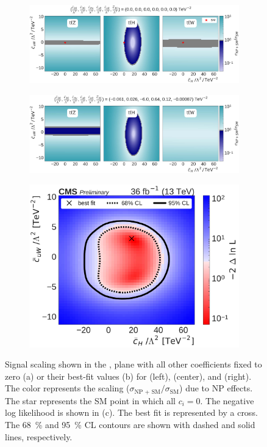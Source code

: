 \begin{figure}
  \vspace{-1cm}
  \begin{subfigure}{\linewidth}
    \centering
    \includegraphics[width=\linewidth]{figures/thirteen-TeV/scaling-frozen/cH_cuW}
    \caption{}
  \end{subfigure}
  \begin{subfigure}{\linewidth}
    \centering
    \includegraphics[width=\linewidth]{figures/thirteen-TeV/scaling/cH_cuW}
    \caption{}
  \end{subfigure}
  \begin{subfigure}{\linewidth}
    \centering
    \includegraphics[width=0.6\linewidth]{figures/thirteen-TeV/nll/cH_cuW}
    \caption{}
  \end{subfigure}
  \vspace{-1cm}
  \setlength{\capwidth}{15cm}
  \caption[Signal scaling and profile likelihood scan in the \cH, \cuW plane]{Signal scaling shown
  in the \cH, \cuW plane with all other coefficients fixed to zero (a) or their best-fit values (b)
  for \ttZ (left), \ttH (center), and \ttW (right). The color represents the scaling ($\sigma_\text{NP
  + SM} / \sigma_\text{SM}$) due to NP effects. The star represents the SM point in which all $c_i=0$.
  The negative log likelihood is shown in (c). The best fit is represented by a cross. The
  \SI{68}{\percent} and \SI{95}{\percent} CL contours are shown with dashed and solid lines,
  respectively.}
\end{figure}

